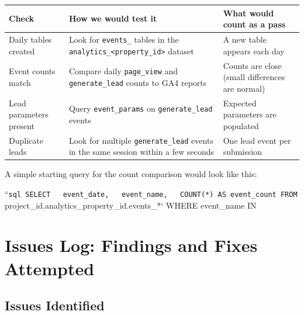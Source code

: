 \documentclass[
  letterpaper,
  DIV=11,
  numbers=noendperiod]{scrartcl}
\newcounter{none} %
\begin{document}
{\def\LTcaptype{none} %
\begin{longtable}[]{@{}
  >{\raggedright\arraybackslash}p{}
  >{\raggedright\arraybackslash}p{}
  >{\raggedright\arraybackslash}p{}@{}}
\toprule\noalign{}
\begin{minipage}[b]{\linewidth}\raggedright
Check
\end{minipage} & \begin{minipage}[b]{\linewidth}\raggedright
How we would test it
\end{minipage} & \begin{minipage}[b]{\linewidth}\raggedright
What would count as a pass
\end{minipage} \\
\midrule\noalign{}
\endhead
\bottomrule\noalign{}
\endlastfoot
Daily tables created & Look for \texttt{events\_} tables in the
\texttt{analytics\_\textless{}property\_id\textgreater{}} dataset & A
new table appears each day \\
Event counts match & Compare daily \texttt{page\_view} and
\texttt{generate\_lead} counts to GA4 reports & Counts are close (small
differences are normal) \\
Lead parameters present & Query \texttt{event\_params} on
\texttt{generate\_lead} events & Expected parameters are populated \\
Duplicate leads & Look for multiple \texttt{generate\_lead} events in
the same session within a few seconds & One lead event per submission \\
\end{longtable}
}

A simple starting query for the count comparison would look like this:

``\texttt{sql\ SELECT\ \ \ event\_date,\ \ \ event\_name,\ \ \ COUNT(*)\ AS\ event\_count\ FROM}project\_id.analytics\_property\_id.events\_*`
WHERE event\_name IN

\section{Issues Log: Findings and Fixes
Attempted}\label{issues-log-findings-and-fixes-attempted}

\subsection{Issues Identified}\label{issues-identified}
\end{document}

